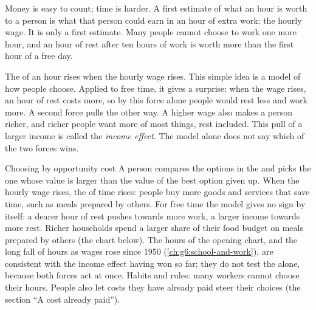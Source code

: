 \begin{measure}
Money is easy to count; time is harder. A first estimate of what an hour is worth to
a person is what that person could earn in an hour of extra work: the hourly wage.
It is only a first estimate. Many people cannot choose to work one more hour, and an
hour of rest after ten hours of work is worth more than the first hour of a free
day.
\end{measure}

The  of an hour rises when the hourly wage rises. This simple idea
is a model of how people choose. Applied to free time, it gives a surprise: when the
wage rises, an hour of rest costs more, so by this force alone people would rest
less and work more. A second force pulls the other way. A higher wage also makes a
person richer, and richer people want more of most things, rest included. This
pull of a larger income is called the \emph{income effect}.
The model alone does not say which of the two forces wins.

\begin{model}{Choosing by opportunity cost}
\assumes A person compares the options in the  and picks the one whose
value is larger than the value of the best option given up.
\predicts When the hourly wage rises, the  of time rises: people
buy more goods and services that save time, such as meals prepared by others. For
free time the model gives no sign by itself: a dearer hour of rest pushes towards
more work, a larger income towards more rest.
\tested Richer households spend a larger share of their food budget on meals
prepared by others (the chart below). The hours of the opening chart, and the long
fall of hours as wages rose since 1950 (\cref{ch:g6:school-and-work}), are
consistent with the income effect having won so far; they do not test the
 alone, because both forces act at once.
\breaks Habits and rules: many workers cannot choose their hours. People also let
costs they have already paid steer their choices (the section ``A cost already
paid'').
\end{model}

